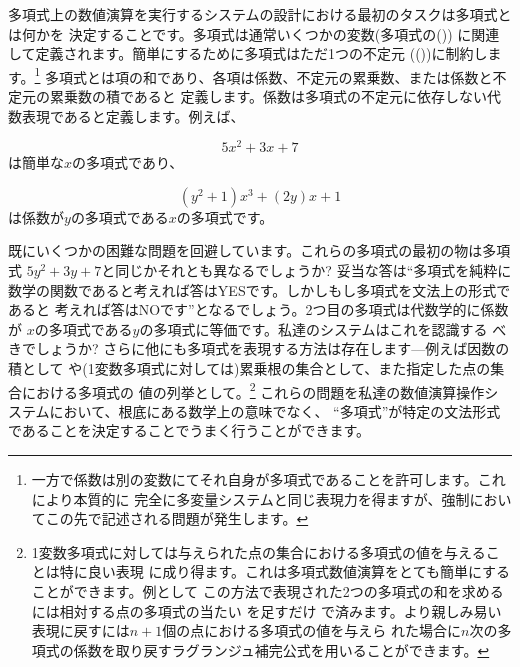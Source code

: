 多項式上の数値演算を実行するシステムの設計における最初のタスクは多項式とは何かを
決定することです。多項式は通常いくつかの変数(多項式の())
に関連して定義されます。簡単にするために多項式はただ1つの不定元
(())に制約します。\footnote{
一方で係数は別の変数にてそれ自身が多項式であることを許可します。これにより本質的に
完全に多変量システムと同じ表現力を得ますが、強制においてこの先で記述される問題が発生します。}
多項式とは項の和であり、各項は係数、不定元の累乗数、または係数と不定元の累乗数の積であると
定義します。係数は多項式の不定元に依存しない代数表現であると定義します。例えば、
\begin{comment}

\begin{example}
5x^2 + 3x + 7
\end{example}

\end{comment}
\begin{displaymath}
 5x^2 + 3x + 7 
\end{displaymath}
\noindent
は簡単な\( x \)の多項式であり、
\begin{comment}

\begin{example}
(y^2 + 1)x^3 + (2y)x + 1
\end{example}

\end{comment}
\begin{displaymath}
 (y^2 + 1)x^3 + (2y)x + 1 
\end{displaymath}
\noindent
は係数が\( y \)の多項式である\( x \)の多項式です。


既にいくつかの困難な問題を回避しています。これらの多項式の最初の物は多項式
\( 5y^2 + 3y + 7 \)と同じかそれとも異なるでしょうか? 妥当な答は``多項式を純粋に
数学の関数であると考えれば答はYESです。しかしもし多項式を文法上の形式であると
考えれば答はNOです''となるでしょう。2つ目の多項式は代数学的に係数が
\( x \)の多項式である\( y \)の多項式に等価です。私達のシステムはこれを認識する
べきでしょうか? さらに他にも多項式を表現する方法は存在します---例えば因数の積として
や(1変数多項式に対しては)累乗根の集合として、また指定した点の集合における多項式の
値の列挙として。\footnote{
1変数多項式に対しては与えられた点の集合における多項式の値を与えることは特に良い表現
に成り得ます。これは多項式数値演算をとても簡単にすることができます。例として
この方法で表現された2つの多項式の和を求めるには相対する点の多項式の当たい を足すだけ
で済みます。より親しみ易い表現に戻すには\( n + 1 \)個の点における多項式の値を与えら
れた場合に\( n \)次の多項式の係数を取り戻すラグランジュ補完公式を用いることができます。}
これらの問題を私達の数値演算操作システムにおいて、根底にある数学上の意味でなく、
``多項式''が特定の文法形式であることを決定することでうまく行うことができます。




